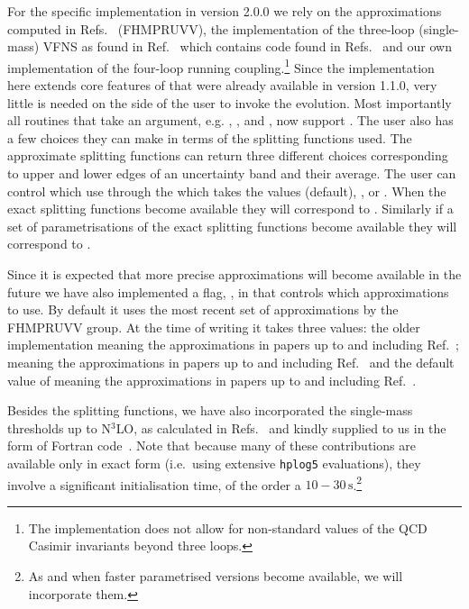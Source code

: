 For the specific implementation in \hoppet version 2.0.0 we rely on
the approximations computed in
Refs.~\cite{Davies:2016jie,Moch:2017uml,Falcioni:2023luc,Falcioni:2023vqq,Moch:2023tdj,Falcioni:2024xyt,Falcioni:2024qpd} (FHMPRUVV),
the implementation of the three-loop (single-mass) VFNS as found in
Ref.~\cite{BlumleinCode} which contains code found in
Refs.~\cite{Ablinger:2024xtt,Fael:2022miw} and our own implementation
of the four-loop running coupling.\footnote{The implementation does
not allow for non-standard values of the QCD Casimir invariants beyond
three loops.}
%
Since the implementation here extends core features of \hoppet that
were already available in version 1.1.0, very little is needed on the
side of the user to invoke the evolution.
%
Most importantly all routines that take an  argument,
e.g. , , and
, now support .
%
The user also has a few choices they can make in terms of the
splitting functions used.
%
The approximate splitting functions can return
three different
choices corresponding to upper and lower edges of an uncertainty band and their
average. 
%
The user can control which use through the
 which takes the values
 (default),
, or
.
%
When the exact splitting functions become available they will
correspond to .
%
Similarly if a set of parametrisations of the exact splitting
functions become available they will correspond to
.

Since it is expected that more precise approximations will become
available in the future we have also implemented a flag,
, in
 that controls which approximations
to use. By default it uses the most recent set of approximations by
the FHMPRUVV group. At the time of writing it takes three values: the
older implementation
 meaning the
approximations in papers up to and including Ref.~\cite{Moch:2023tdj};
 meaning the
approximations in papers up to and including
Ref.~\cite{Falcioni:2024xyt} and the default value of
 meaning the
approximations in papers up to and including
Ref.~\cite{Falcioni:2024qpd}.

Besides the splitting functions, we have also incorporated the
single-mass thresholds up to N$^3$LO, as calculated in
Refs.~\cite{Bierenbaum:2009mv,Ablinger:2010ty,Kawamura:2012cr,Blumlein:2012vq,ABLINGER2014263,Ablinger:2014nga,Ablinger:2014vwa,Behring:2014eya,Ablinger:2019etw,Behring:2021asx,Ablinger:2023ahe,Ablinger:2024xtt}
and kindly supplied to us in the form of Fortran
code~\cite{BlumleinCode,Fael:2022miw}.
%
Note that because many of these contributions are available only in
exact form (i.e.\ using extensive \texttt{hplog5} evaluations), they
involve a significant initialisation time, of the order a
$10{-}30\,\text{s}$.\footnote{As and when faster 
  parametrised versions become available, we will incorporate them.}


